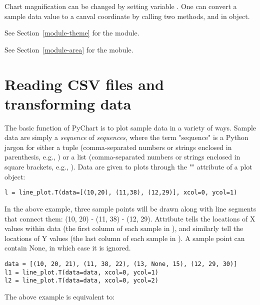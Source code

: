 \documentclass{howto}
\newcommand{\pychart}{PyChart}
\newcommand{\xref}[1]{See Section~\ref{#1}}
\begin{document}
Chart magnification can be changed by setting
variable .
One can convert a sample data value to a canval coordinate by
calling two methods,  and  in  object.


\begin{seealso}
  \xref{module-theme} for the  module.



  \xref{module-area} for the  mobule.
\end{seealso}

\section{Reading CSV files and transforming data}


The basic function of \pychart{} is to plot sample data in a variety of
ways.  Sample data are simply a \emph{sequence} of \emph{sequences},
where the term "sequence" is a Python jargon for either a tuple
(comma-separated numbers or strings enclosed in parenthesis, e.g.,
) or a list
(comma-separated numbers or strings enclosed in square brackets, e.g.,
\code{[5, 10, 15]}). Data
are given to plots through the "" attribute of a plot object:

\begin{verbatim}
l = line_plot.T(data=[(10,20), (11,38), (12,29)], xcol=0, ycol=1)
\end{verbatim}

\noindent
In the above example, three sample points will be drawn along with line
segments that connect them: (10, 20) - (11, 38) - (12, 29).
Attribute  tells the locations of X values within data (the
first column of each sample in ), and  similarly
tell the locations of Y values (the last column of each sample in
).  A sample point can contain None, in which case
it is ignored.

\begin{verbatim}
data = [(10, 20, 21), (11, 38, 22), (13, None, 15), (12, 29, 30)]
l1 = line_plot.T(data=data, xcol=0, ycol=1)
l2 = line_plot.T(data=data, xcol=0, ycol=2)
\end{verbatim}

\noindent
The above example is equivalent to:
\end{document}
